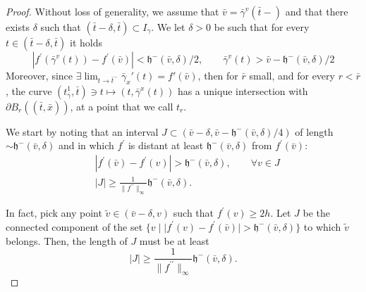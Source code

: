 \documentclass[11pt, twoside, reqno]{amsart}
\theoremstyle{definition}
\theoremstyle{remark}
\numberwithin{equation}{section}
\newcommand{\second}{{\prime \prime}}
\begin{document}
\begin{proof}
Without loss of generality, we assume that $\bar v = \bar \gamma^v(\bar t-)$ and that there exists $\delta$ such that $(\bar t-\delta, \bar t) \subset I_\gamma$. We let $\delta > 0$ be such that for every $t \in (\bar t-\delta, \bar t)$ it holds
$$
|f^{\prime}(\bar \gamma^v(t)) -f^{\prime}(\bar v) | < \mathfrak h^-(\bar v, \delta)/2, \qquad \bar \gamma^v(t) > \bar v-\mathfrak h^-(\bar v, \delta)/2
$$
Moreover, since $\exists \lim_{t\to \bar t^-}\bar \gamma_x'(t)=f'(\bar v)$, then for $\bar r$ small, and for every $r < \bar r$, the curve $(t^1_{\bar \gamma}, \bar t)  \ni t \mapsto (t, \bar \gamma^x(t))$ has a unique intersection with $\partial B_r((\bar t, \bar x))$, at a point that we call $t_r$. 

We start by noting that an interval $J \subset (\bar v-\delta, \bar v- \mathfrak h^-(\bar v, \delta)/4)$ of length $\sim  \mathfrak h^-(\bar v, \delta)$ and in which $f^{\prime}$ is distant at least $\mathfrak h^-(\bar v, \delta)$ from $f^{\prime}(\bar v)$:
 \begin{equation}\label{eq:Iilowebound}
 \begin{aligned}
 &|f^{\prime}(\bar v)-f^{\prime}(v)| >  \mathfrak h^-(\bar v, \delta), \qquad \forall v \in J\\
    & |J| \geq \frac{1}{\|f^{\second}\|_{\infty}}  \mathfrak h^-(\bar v, \delta).
     \end{aligned}
 \end{equation}

In fact, pick any point $\tilde v \in (\bar v-\delta, v)$ such that $f^\prime(v) \geq 2h$. Let $J$ be the connected component of the set $\{v \; | \; |f^\prime(v) - f^\prime(\bar v)| > \mathfrak h^-(\bar v, \delta)\}$ to which $\tilde v$ belongs. Then, the length of $J$ must be at least 
$$
|J| \geq \frac{1}{\|f^\second\|_{\infty}} \mathfrak h^-(\bar v, \delta).
$$




\end{proof}
\end{document}
